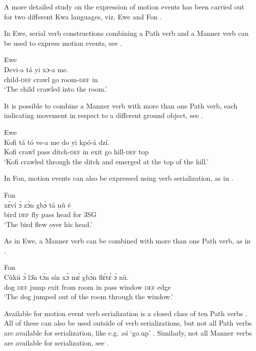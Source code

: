 \documentclass[output=paper,colorlinks,citecolor=brown]{langscibook}
\begin{document}
A more detailed study on the expression of motion events has been carried out for two different Kwa languages, viz. Ewe \citep{Ameka_Essegbey_2013} and Fon \citep{LambertBrtire_2009}.

In Ewe, serial verb constructions combining a Path verb and a Manner verb can be used to express motion events, see .

\ea\label{ex:3:13}
Ewe \citep[24]{Ameka_Essegbey_2013} \\
\gll    Devi-a tá yi xɔ-a me.\\
        child-\textsc{def} crawl go room-\textsc{def} in \\
\glt ‘The child crawled into the room.’
\z

It is possible to combine a Manner verb with more than one Path verb, each indicating movement in respect to a different ground object, see .

\ea\label{ex:3:14}Ewe \citep[30--31]{Ameka_Essegbey_2013}\\
\gll  Kofi tá tó ve-a me do yi kpó-á dzí.\\
      Kofi crawl pass ditch-\textsc{def} in exit go hill-\textsc{def} top\\
\glt ‘Kofi crawled through the ditch and emerged  at the top of the hill.’
\z

In Fon, motion events can also be expressed using verb serialization, as in .

\ea\label{ex:3:15}Fon \citep[14]{LambertBrtire_2009}\\
\gll xɛ̀ví ɔ̀ zɔ̀n gbɔ̀ tá nǔ é\\
     bird \textsc{def} fly pass head for \textsc{3SG} \\
\glt ‘The bird flew over his head.’
\z

As in Ewe, a Manner verb can be combined with more than one Path verb, as in .

\ea Fon \citep[22]{LambertBrtire_2009}\label{ex:3:16}\\
\gll Cùkú ɔ́ lɔ̌n tɔ́n sín xɔ̀ mɛ̀ gbɔ̀n flɛ́tɛ́ ɔ́ nù.\\
     dog \textsc{def} jump exit from room in pass window \textsc{def} edge \\
\glt ‘The dog jumped out of the room through the   window.’
\z


Available for motion event verb serialization is a closed class of ten Path verbs \citep[9]{LambertBrtire_2009}. All of these can also be used outside of verb serializations, but not all Path verbs are available for serialization, like e.g. \emph{xá} ‘go.up’ \citep[16]{LambertBrtire_2009}. Similarly, not all Manner verbs are available for serialization, see .
\end{document}
